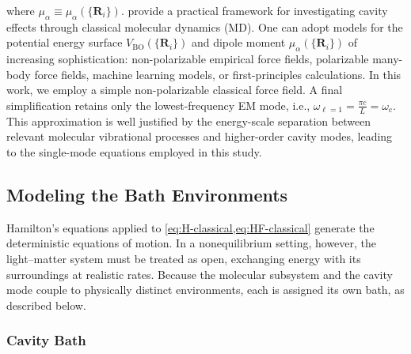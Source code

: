 where $\mu_\alpha \equiv \mu_\alpha(\{ \bm{R}_i \})$.
 provide a practical framework for investigating cavity effects through classical molecular dynamics (MD).
One can adopt models for the potential energy surface $V_\mathrm{BO}(\{ \bm{R}_i\})$ and dipole moment $\mu_\alpha(\{\bm{R}_i\})$ of increasing sophistication: non-polarizable empirical force fields, polarizable many-body force fields, machine learning models, or first-principles calculations.
In this work, we employ a simple non-polarizable classical force field.
A final simplification retains only the lowest-frequency EM mode, i.e., $\omega_{\ell=1} = \frac{\pi c }{L} = \omega_\mathrm{c}$.
This approximation is well justified by the energy-scale separation between relevant molecular vibrational processes and higher-order cavity modes, leading to the single-mode equations employed in this study.



\subsection{Modeling the Bath Environments}
\label{app:bath}

Hamilton's equations applied to \cref{eq:H-classical,eq:HF-classical} generate the deterministic equations of motion.
In a nonequilibrium setting, however, the light--matter system must be treated as open, exchanging energy with its surroundings at realistic rates.
Because the molecular subsystem and the cavity mode couple to physically distinct environments, each is assigned its own bath, as described below.


\subsubsection{Cavity Bath} 

